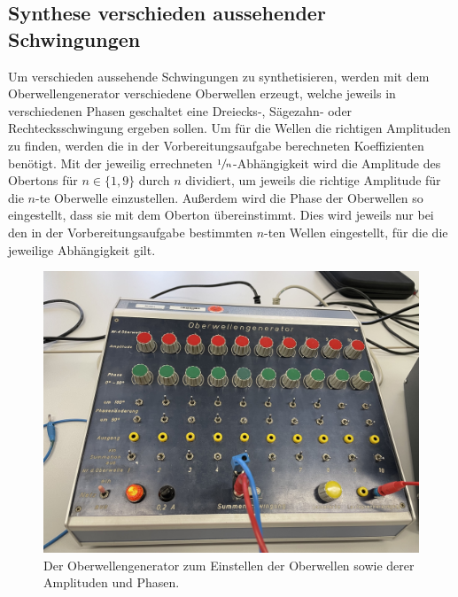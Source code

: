 \subsection{Synthese verschieden aussehender Schwingungen}
Um verschieden aussehende Schwingungen zu synthetisieren, werden mit dem Oberwellengenerator verschiedene Oberwellen erzeugt, welche jeweils in verschiedenen Phasen geschaltet 
eine Dreiecks-, Sägezahn- oder Rechtecksschwingung ergeben sollen. Um für die Wellen die richtigen Amplituden zu finden, werden die in der Vorbereitungsaufgabe berechneten 
Koeffizienten benötigt. Mit der jeweilig errechneten $\sfrac{1}{n}$-Abhängigkeit wird die Amplitude des Obertons für $n\in\{1,9\}$ durch $n$ dividiert, um 
jeweils die richtige Amplitude für die $n$-te Oberwelle einzustellen. Außerdem wird die Phase der Oberwellen so eingestellt, dass sie mit
dem Oberton übereinstimmt. Dies wird jeweils nur bei den in der Vorbereitungsaufgabe bestimmten $n$-ten 
Wellen eingestellt, für die die jeweilige Abhängigkeit gilt.
\begin{figure}[H]
    \centering
    \includegraphics[scale=0.06]{Messdaten_Bilder/Oberwellengenerator.jpeg}
    \caption{Der Oberwellengenerator zum Einstellen der Oberwellen sowie derer Amplituden und Phasen.}
    \label{fig:Oberwelle}
\end{figure}
